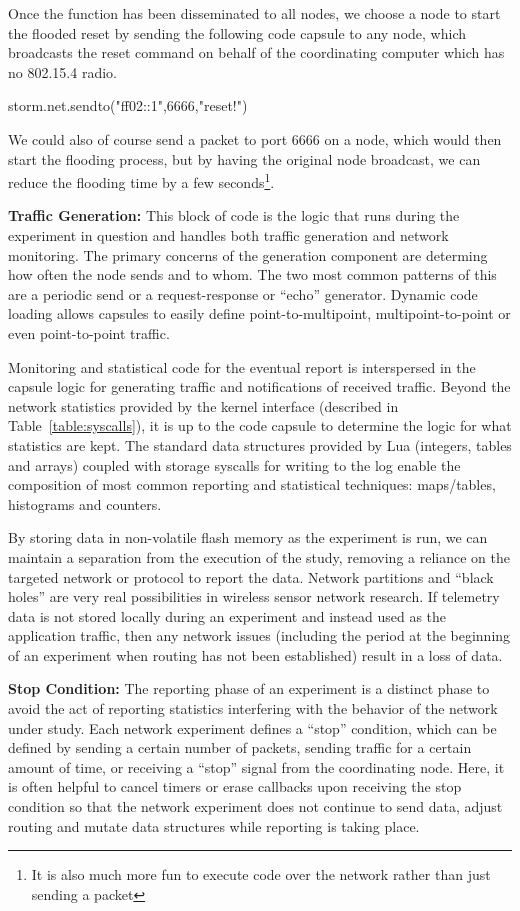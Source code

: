 Once the function has been disseminated to all nodes, we choose a node to start the flooded reset by sending the following code capsule to any node, which broadcasts the reset command on behalf of the coordinating computer which has no 802.15.4 radio.

\begin{luacode}
storm.net.sendto("ff02::1",6666,"reset!")
\end{luacode}

We could also of course send a packet to port 6666 on a node, which would then start the flooding process, but by having the original node broadcast, we can reduce the flooding time by a few seconds\footnote{It is also much more fun to execute code over the network rather than just sending a packet}.

\textbf{Traffic Generation:}  This block of code is the logic that runs during the experiment in question and handles both traffic generation and network monitoring.
The primary concerns of the generation component are determing how often the node sends and to whom.
The two most common patterns of this are a periodic send or a request-response or ``echo'' generator.
Dynamic code loading allows capsules to easily define point-to-multipoint, multipoint-to-point or even point-to-point traffic.

Monitoring and statistical code for the eventual report is interspersed in the capsule logic for generating traffic and notifications of received traffic.
Beyond the network statistics provided by the kernel interface (described in Table~\ref{table:syscalls}), it is up to the code capsule to determine the logic for what statistics are kept.
The standard data structures provided by Lua (integers, tables and arrays) coupled with storage syscalls for writing to the log enable the composition of most common reporting and statistical techniques: maps/tables, histograms and counters.

By storing data in non-volatile flash memory as the experiment is run, we can maintain a separation from the execution of the study, removing a reliance on the targeted network or protocol to report the data.
Network partitions and ``black holes'' are very real possibilities in wireless sensor network research.
If telemetry data is not stored locally during an experiment and instead used as the application traffic, then any network issues (including the period at the beginning of an experiment when routing has not been established) result in a loss of data.

\textbf{Stop Condition:}
The reporting phase of an experiment is a distinct phase to avoid the act of reporting statistics interfering with the behavior of the network under study.
Each network experiment defines a ``stop'' condition, which can be defined by sending a certain number of packets, sending traffic for a certain amount of time, or receiving a ``stop'' signal from the coordinating node.
Here, it is often helpful to cancel timers or erase callbacks upon receiving the stop condition so that the network experiment does not continue to send data, adjust routing and mutate data structures while reporting is taking place.

